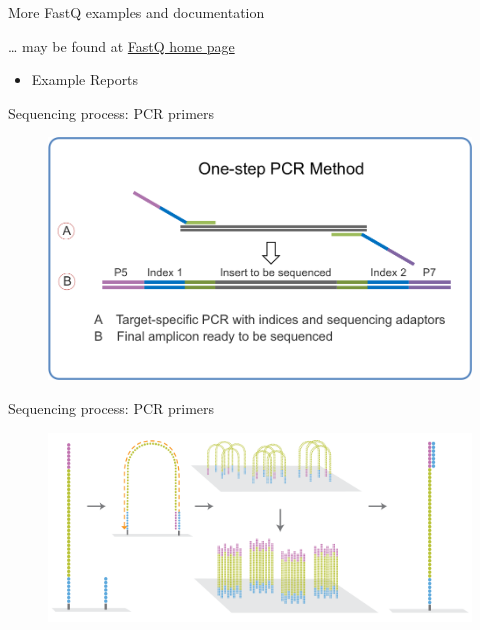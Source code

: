 \begin{frame}{More FastQ examples and documentation}

\ldots{} may be found at
\href{http://www.bioinformatics.babraham.ac.uk/projects/fastqc/}{FastQ
home page}

\begin{itemize}
\itemsep1pt\parskip0pt
\item
  Example Reports
\end{itemize}

\end{frame}

\begin{frame}{Sequencing process: PCR primers}

\begin{figure}[htbp]
\centering
\includegraphics[width=\textwidth,height=0.8\textheight,keepaspectratio]{images/pcr_adaptors.png}
\end{figure}

\end{frame}

\begin{frame}{Sequencing process: PCR primers}

\begin{figure}[htbp]
\centering
\includegraphics[width=\textwidth,height=0.8\textheight,keepaspectratio]{images/illumina_cluster_generation.png}
\end{figure}

\end{frame}

